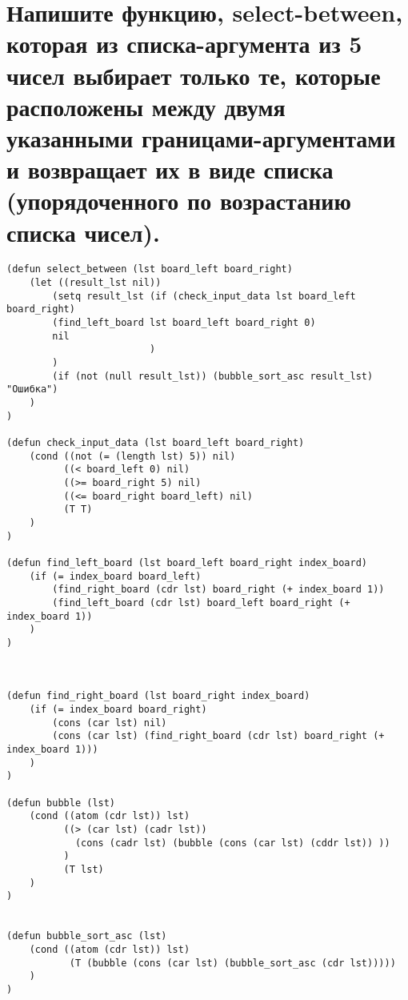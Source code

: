 \section{Напишите функцию, select-between, которая из списка-аргумента из 5 чисел выбирает только те, которые расположены между двумя указанными границами-аргументами и возвращает их в виде списка (упорядоченного по возрастанию списка чисел).}
\newpage
\begin{lstlisting}[basicstyle=\footnotesize, caption=Задание 9]
(defun select_between (lst board_left board_right)
	(let ((result_lst nil))
		(setq result_lst (if (check_input_data lst board_left board_right) 
		(find_left_board lst board_left board_right 0) 
		nil
						 )
		)
		(if (not (null result_lst)) (bubble_sort_asc result_lst) "Ошибка")
	)
)

(defun check_input_data (lst board_left board_right)
	(cond ((not (= (length lst) 5)) nil)
		  ((< board_left 0) nil)
		  ((>= board_right 5) nil)
		  ((<= board_right board_left) nil)
		  (T T)
	)
)

(defun find_left_board (lst board_left board_right index_board)
	(if (= index_board board_left) 
	    (find_right_board (cdr lst) board_right (+ index_board 1))
		(find_left_board (cdr lst) board_left board_right (+ index_board 1))   
	)
)



(defun find_right_board (lst board_right index_board)
	(if (= index_board board_right)
		(cons (car lst) nil) 
		(cons (car lst) (find_right_board (cdr lst) board_right (+ index_board 1)))
	)
)

(defun bubble (lst)
	(cond ((atom (cdr lst)) lst)
		  ((> (car lst) (cadr lst)) 
			(cons (cadr lst) (bubble (cons (car lst) (cddr lst)) ))
		  )
		  (T lst)
	)
)


(defun bubble_sort_asc (lst)
	(cond ((atom (cdr lst)) lst)
		   (T (bubble (cons (car lst) (bubble_sort_asc (cdr lst)))))
	)
)
\end{lstlisting}